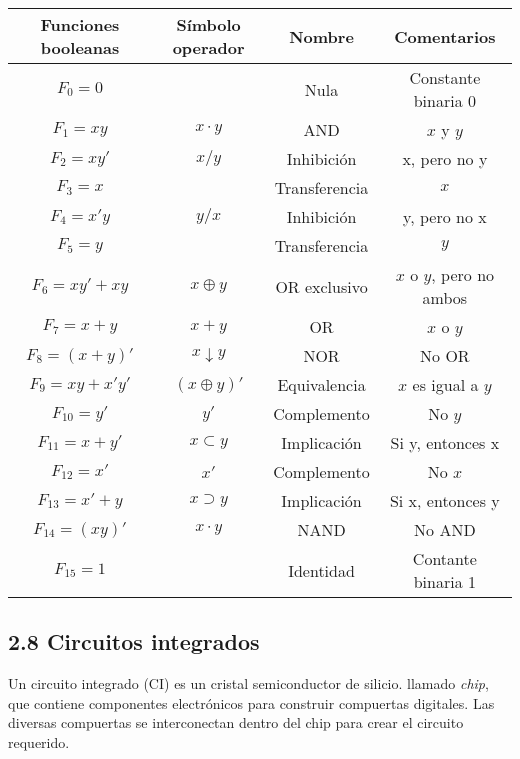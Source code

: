 \begin{table}[h] \centering \begin{tabular}{cccc} \toprule Funciones booleanas
                      & S\'{i}mbolo operador & Nombre           & Comentarios  \\ \midrule $F_0 = 0$ & & Nula &
        Constante binaria 0                                                    \\ $F_1 = xy$ & $x \cdot y$ & AND &$x$ y $y$ \\ $F_2 = xy'$
                      & $x/y$                & Inhibici\'{o}n   & x, pero no y \\ $F_3 = x$ & & Transferencia & $x$ \\
        $F_4 = x'y$   & $y/x$                & Inhibici\'{o}n   & y, pero no x \\ $F_5 = y$ & &
        Transferencia & $y$                                                    \\ $F_6 = xy' + xy$ & $x \oplus y$ & OR exclusivo & $x$ o
        $y$, pero no ambos                                                     \\ $F_7 = x + y$ & $x + y$ & OR & $x$ o $y$ \\ $F_8 = (x +
        y)'$          & $x \downarrow y$     & NOR              & No OR        \\ $F_9 = xy + x'y'$ & $(x \oplus y)'$ &
        Equivalencia  & $x$ es igual a $y$                                     \\ $F_{10} = y'$ & $y'$ & Complemento & No $y$
        \\ $F_{11} = x + y'$ & $x \subset y$ & Implicaci\'{o}n & Si y, entonces x \\
        $F_{12} = x'$ & $x'$                 & Complemento      & No $x$       \\ $F_{13} = x' + y$ & $x \supset y$
                      & Implicaci\'{o}n      & Si x, entonces y                \\ $F_{14} = (xy)'$ & $x \cdot y$ & NAND &
        No AND                                                                 \\ $F_{15} = 1$ & & Identidad & Contante binaria 1 \\ \bottomrule
    \end{tabular} \end{table} \newpage

\subsection*{2.8 Circuitos integrados} Un circuito integrado (CI) es un cristal
semiconductor de silicio. llamado \textit{chip}, que contiene componentes
electr\'{o}nicos para construir compuertas digitales. Las diversas compuertas se
interconectan dentro del chip para crear el circuito requerido.

